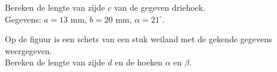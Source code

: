 \begin{oef}
Bereken de lengte van zijde $c$ van de gegeven driehoek.\\
Gegevens: $a=13$ mm, $b=20$ mm, $\alpha=21^\circ$. 

\end{oef}

\begin{oef}
	Op de figuur is een schets van een stuk weiland met de gekende gegevens weergegeven. \\
	Bereken de lengte van zijde $d$ en de hoeken $\alpha$ en $\beta$.
	
\end{oef}


